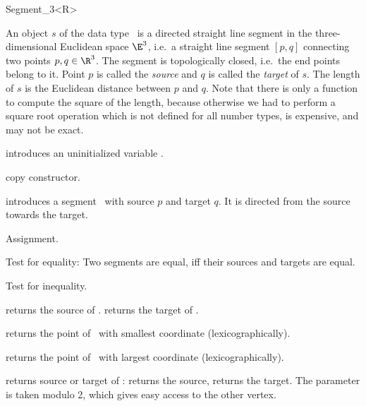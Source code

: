 \begin{ccRefClass} {Segment_3<R>}


\ccDefinition  An object $s$ of the data type \ccRefName\ is a directed
straight line segment in the three-dimensional Euclidean space $\E^3$, i.e.\ a
straight line segment $[p,q]$ connecting two points $p,q \in
\R^3$. The segment is topologically closed, i.e.\  the end
points belong to it. Point $p$ is called the {\em source} and $q$
is called the {\em target} of $s$. The length of $s$ is the
Euclidean distance between $p$ and $q$. Note that there is only a function
to compute the square of the length, because otherwise we had to
perform a square root operation which is not defined for all
number types, is expensive, and may not be exact.

\ccCreation
{}


\ccHidden {}
             {introduces an uninitialized variable \ccVar.}

\ccHidden {}
 	    {copy constructor.}

            {introduces a segment \ccVar\ with source $p$
             and target $q$. It is directed from the source towards
             the target.}


\ccOperations

\ccHidden {}
        {Assignment.}

       {Test for equality: Two segments are equal, iff their sources and
        targets are equal.}

       {Test for inequality.}

       {returns the source  of \ccVar.}
\ccGlue
{}
       {returns the target of \ccVar.}

       {returns the point of \ccVar\ with smallest coordinate (lexicographically).}

       {returns the point of \ccVar\ with largest coordinate (lexicographically).}

       {returns source or target of \ccVar:    returns
        the source,  returns the target. 
        The parameter  is taken modulo 2, which gives 
        easy access to the other vertex.}


\end{ccRefClass}

